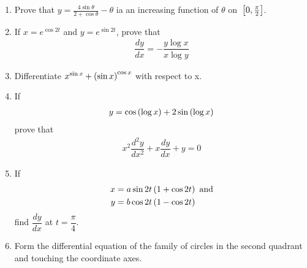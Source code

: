 \begin{enumerate}
	\item Prove that $ y = \frac{4\sin \theta}{2+ \cos \theta} - \theta$ ia an increasing function of $\theta$ on ${}\left[0,\frac{\pi}{2}\right]$.
\item If $x=e^{\cos 2t}$ and $y=e^{\sin 2t}$, prove that
          \begin{align*}
              \dfrac{dy}{dx}= -\dfrac{y \log x}{x \log y}
          \end{align*}
    \item Differentiate $x^{\sin x}+ \left(\sin x\right)^{\cos x}$ with respect to x.
    \item If
          \begin{align*}
              y=\cos \left(\log x\right) + 2 \sin \left(\log x\right)
          \end{align*}
          prove that
          \begin{align*}
              x^2 \dfrac{d^2 y}{dx^2} + x \dfrac{dy}{dx} +y =0
          \end{align*}
    \item If
          \begin{align*}
              x & =a\sin 2t\left(1+\cos 2t\right) \text{ and} \\
              y & =b\cos 2t\left(1-\cos 2t\right)
          \end{align*}
          find $\dfrac{dy}{dx}$ at $t=\dfrac{\pi}{4}$.
    \item Form the differential equation of the family of circles in the second quadrant and touching the coordinate axes.
\end{enumerate}
